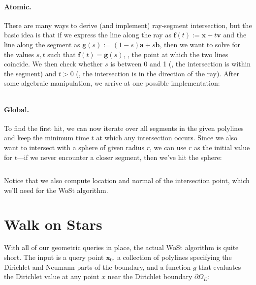 \documentclass{article}
\renewcommand{\vec}[1]{\textbf{#1}}
\begin{document}
\paragraph{Atomic.} There are many ways to derive (and implement) ray-segment intersection, but the basic idea is that if we express the line along the ray as \(\vec{f}(t) := \vec{x} + t\vec{v}\) and the line along the segment as \(\vec{g}(s) := (1-s)\vec{a} + s\vec{b}\), then we want to solve for the values \(s,t\) such that \(\vec{f}(t) = \vec{g}(s)\), \ie, the point at which the two lines coincide.  We then check whether \(s\) is between 0 and 1 (\ie, the intersection is within the segment) and \(t > 0\) (\ie, the intersection is in the direction of the ray).  After some algebraic manipulation, we arrive at one possible implementation:

\inputminted[fontsize=\small,linenos,firstline=48,lastline=60,bgcolor=bg]{cpp}{../code/WoStLaplace2D.cpp}

\paragraph{Global.} To find the first hit, we can now iterate over all segments in the given polylines and keep the minimum time \(t\) at which any intersection occurs.  Since we also want to intersect with a sphere of given radius \(r\), we can use \(r\) as the initial value for \(t\)---if we never encounter a closer segment, then we've hit the sphere:

\inputminted[fontsize=\small,linenos,firstline=90,lastline=109,bgcolor=bg]{cpp}{../code/WoStLaplace2D.cpp}

Notice that we also compute location and normal of the intersection point, which we'll need for the WoSt algorithm.

\section{Walk on Stars}
\label{sec:WalkOnStars}

With all of our geometric queries in place, the actual WoSt algorithm is quite short.  The input is a query point \(\vec{x}_0\), a collection of polylines specifying the Dirichlet and Neumann parts of the boundary, and a function \(g\) that evaluates the Dirichlet value at any point \(x\) near the Dirichlet boundary \(\partial\Omega_D\):

\inputminted[fontsize=\small,linenos,firstline=118,lastline=127,bgcolor=bg]{cpp}{../code/WoStLaplace2D.cpp}
\end{document}
